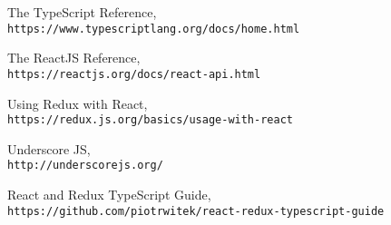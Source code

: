 \documentclass[rel_mlp]{iiufrgs}
\begin{document}


\begin{thebibliography}{9}
The TypeScript Reference,
\\\texttt{https://www.typescriptlang.org/docs/home.html}

The ReactJS Reference,
\\\texttt{https://reactjs.org/docs/react-api.html}


Using Redux with React,
\\\texttt{https://redux.js.org/basics/usage-with-react}

Underscore JS,
\\\texttt{http://underscorejs.org/}

React and Redux TypeScript Guide,
\\\texttt{https://github.com/piotrwitek/react-redux-typescript-guide}

\end{thebibliography}
\end{document}
